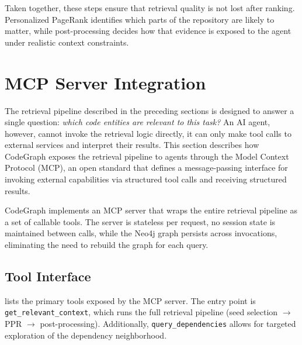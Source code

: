 Taken together, these steps ensure that retrieval quality is not lost after ranking. Personalized PageRank identifies which parts of the repository are likely to matter, while post-processing decides how that evidence is exposed to the agent under realistic context constraints.


\section{MCP Server Integration}
\label{sec:mcp-integration}

The retrieval pipeline described in the preceding sections is designed to answer a single question: \emph{which code entities are relevant to this task?} An AI agent, however, cannot invoke the retrieval logic directly, it can only make tool calls to external services and interpret their results. This section describes how CodeGraph exposes the retrieval pipeline to agents through the Model Context Protocol (MCP), an open standard that defines a message-passing interface for invoking external capabilities via structured tool calls and receiving structured results.

CodeGraph implements an MCP server that wraps the entire retrieval pipeline as a set of callable tools. The server is stateless per request, no session state is maintained between calls, while the Neo4j graph persists across invocations, eliminating the need to rebuild the graph for each query.

\subsection{Tool Interface}
\label{sec:tool-interface}

 lists the primary tools exposed by the MCP server. The entry point is \texttt{get\_relevant\_context}, which runs the full retrieval pipeline (seed selection $\to$ PPR $\to$ post-processing). Additionally, \texttt{query\_dependencies} allows for targeted exploration of the dependency neighborhood.

